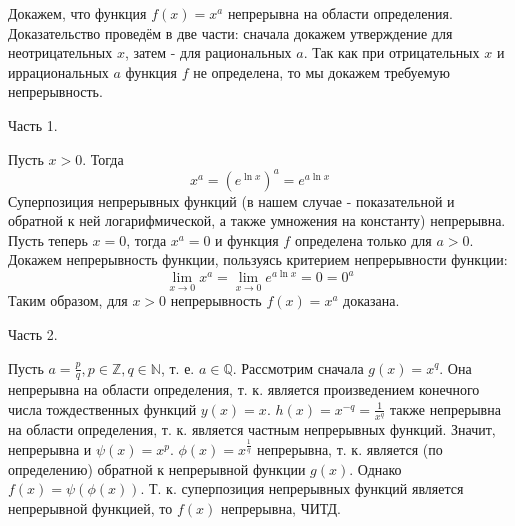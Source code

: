 \documentclass[a4paper]{article}
\begin{document}

Докажем, что функция $f(x)=x^a$ непрерывна на области определения. Доказательство проведём в две части: сначала докажем утверждение для неотрицательных $x$, затем - для рациональных $a$. Так как при отрицательных $x$ и иррациональных $a$ функция $f$ не определена, то мы докажем требуемую непрерывность.

Часть 1.

Пусть $x>0$. Тогда
$$
x^a=\left(e^{\ln x}\right)^a=e^{a \ln x}
$$
Суперпозиция непрерывных функций (в нашем случае - показательной и обратной к ней логарифмической, а также умножения на константу) непрерывна. Пусть теперь $x=0$, тогда $x^a=0$ и функция $f$ определена только для $a>0$. Докажем непрерывность функции, пользуясь критерием непрерывности функции:
\[
\lim_{x \to 0}x^a=\lim_{x \to 0}e^{a \ln x}=0=0^a
\]
Таким образом, для $x>0$ непрерывность $f(x)=x^a$ доказана.

Часть 2.

Пусть $a=\frac{p}{q}, p \in \mathbb{Z}, q \in \mathbb{N}$, т. е. $a \in \mathbb{Q}$.
Рассмотрим сначала $g(x)=x^q$. Она непрерывна на области определения, т. к. является произведением конечного числа тождественных функций $y(x)=x$. $h(x)=x^{-q}=\frac{1}{x^q}$ также непрерывна на области определения, т. к. является частным непрерывных функций. Значит, непрерывна и $\psi(x)=x^p$. $\phi(x)=x^\frac{1}{q}$ непрерывна, т. к. является (по определению) обратной к непрерывной функции $g(x)$. Однако $f(x)=\psi(\phi(x))$.
Т. к. суперпозиция непрерывных функций является непрерывной функцией, то $f(x)$ непрерывна, ЧИТД.
\end{document}
